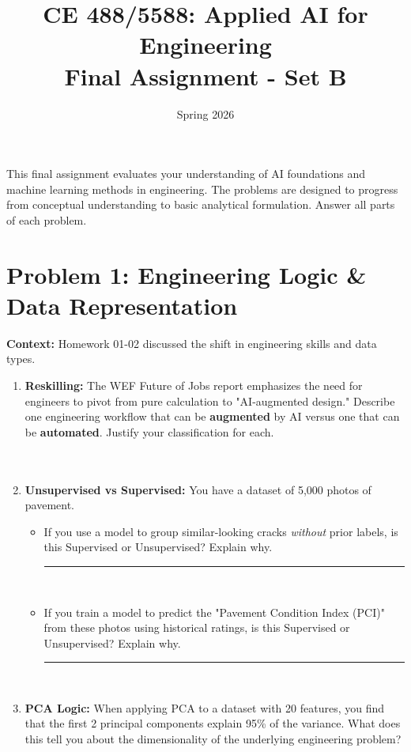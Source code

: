 \documentclass[12pt]{article}
\begin{document}
\title{CE 488/5588: Applied AI for Engineering \\ Final Assignment - Set B}
\author{}
\date{Spring 2026}

\maketitle

\begin{center}
\end{center}

\begin{ch-box}
This final assignment evaluates your understanding of AI foundations and machine learning methods in engineering. The problems are designed to progress from conceptual understanding to basic analytical formulation. Answer all parts of each problem.
\end{ch-box}

\section{Problem 1: Engineering Logic \& Data Representation}
\textbf{Context:} Homework 01-02 discussed the shift in engineering skills and data types.

\begin{enumerate}[label=(\alph*)]
    \item \textbf{Reskilling:} The WEF Future of Jobs report emphasizes the need for engineers to pivot from pure calculation to "AI-augmented design." Describe one engineering workflow that can be \textbf{augmented} by AI versus one that can be \textbf{automated}. Justify your classification for each. \\
    \fullunderline \\
    \fullunderline \\
    \fullunderline

    \item \textbf{Unsupervised vs Supervised:} You have a dataset of 5,000 photos of pavement. 
    \begin{itemize}
        \item If you use a model to group similar-looking cracks \textit{without} prior labels, is this Supervised or Unsupervised? Explain why. \rule{1.5in}{0.15mm} \\
        \fullunderline
        \item If you train a model to predict the "Pavement Condition Index (PCI)" from these photos using historical ratings, is this Supervised or Unsupervised? Explain why. \rule{1.5in}{0.15mm} \\
        \fullunderline
    \end{itemize}

    \item \textbf{PCA Logic:} When applying PCA to a dataset with 20 features, you find that the first 2 principal components explain 95\% of the variance. What does this tell you about the dimensionality of the underlying engineering problem? \\
    \fullunderline \\
    \fullunderline
\end{enumerate}
\end{document}
